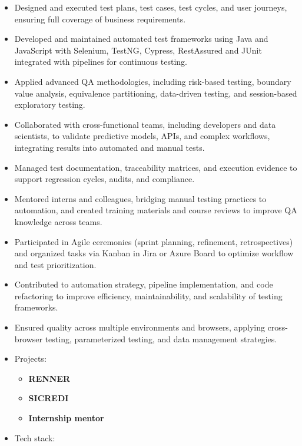 
{\small
{}
\begin{itemize}
    \item Designed and executed test plans, test cases, test cycles, and user journeys, ensuring full coverage of business requirements.
    \item Developed and maintained automated test frameworks using Java and JavaScript with Selenium, TestNG, Cypress, RestAssured and JUnit integrated with pipelines for continuous testing.
    \item Applied advanced QA methodologies, including risk-based testing, boundary value analysis, equivalence partitioning, data-driven testing, and session-based exploratory testing.
    \item Collaborated with cross-functional teams, including developers and data scientists, to validate predictive models, APIs, and complex workflows, integrating results into automated and manual tests.
    \item Managed test documentation, traceability matrices, and execution evidence to support regression cycles, audits, and compliance.
    \item Mentored interns and colleagues, bridging manual testing practices to automation, and created training materials and course reviews to improve QA knowledge across teams.
    \item Participated in Agile ceremonies (sprint planning, refinement, retrospectives) and organized tasks via Kanban in Jira or Azure Board to optimize workflow and test prioritization.
    \item Contributed to automation strategy, pipeline implementation, and code refactoring to improve efficiency, maintainability, and scalability of testing frameworks.
    \item Ensured quality across multiple environments and browsers, applying cross-browser testing, parameterized testing, and data management strategies.
    \item Projects:
    \begin{itemize}
        \item \textbf{RENNER}
        \item \textbf{SICREDI}
        \item \textbf{Internship mentor}
    \end{itemize}
    \item Tech stack:

\end{itemize}}
